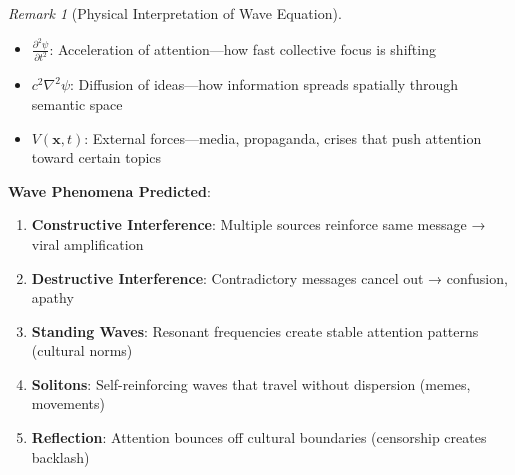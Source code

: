\documentclass[11pt,a4paper]{article}
\theoremstyle{definition}
\theoremstyle{remark}
\newtheorem{remark}{Remark}[section]
\begin{document}
\begin{small}
\begin{remark}[Physical Interpretation of Wave Equation]
\begin{itemize}
    \item \(\frac{\partial^2 \psi}{\partial t^2}\): Acceleration of attention—how fast collective focus is shifting
    \item \(c^2 \nabla^2 \psi\): Diffusion of ideas—how information spreads spatially through semantic space
    \item \(V(\mathbf{x}, t)\): External forces—media, propaganda, crises that push attention toward certain topics
\end{itemize}

\textbf{Wave Phenomena Predicted}:
\begin{enumerate}
    \item \textbf{Constructive Interference}: Multiple sources reinforce same message → viral amplification
    \item \textbf{Destructive Interference}: Contradictory messages cancel out → confusion, apathy
    \item \textbf{Standing Waves}: Resonant frequencies create stable attention patterns (cultural norms)
    \item \textbf{Solitons}: Self-reinforcing waves that travel without dispersion (memes, movements)
    \item \textbf{Reflection}: Attention bounces off cultural boundaries (censorship creates backlash)
\end{enumerate}
\end{remark}

\begin{figure}[H]
\centering
{}
\end{figure}
\end{small}
\end{document}
